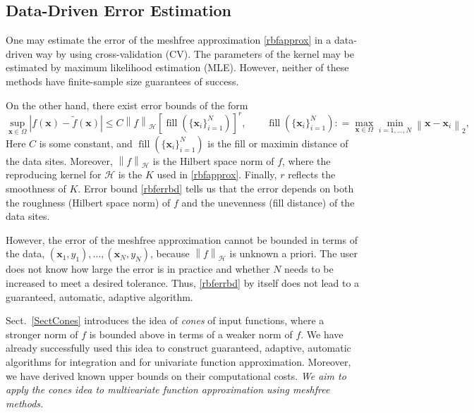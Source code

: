 \documentclass[11pt]{NSFamsart}
\newcommand{\tf}{\tilde{f}}
\newcommand{\bx}{{\boldsymbol{x}}}
\newcommand{\cx}{{\Omega}}
\def\abs#1{\ensuremath{\left \lvert #1 \right \rvert}}
\newcommand{\norm}[2][{}]{\ensuremath{\left \lVert #2 \right \rVert}_{#1}}
\DeclareMathOperator{\filldis}{fill}
\newcommand{\desn}{\{\bx_i\}_{i=1}^N}
\newcommand{\ch}{\mathcal{H}}
\begin{document}
\subsection*{Data-Driven Error Estimation} One may estimate the error of the meshfree approximation \eqref{rbfapprox} in a data-driven way by using cross-validation (CV).  The parameters of the kernel may be estimated by maximum likelihood estimation (MLE).  However, neither of these methods have finite-sample size guarantees of success.

On the other hand, there exist error bounds of the form \citep{Wen05a}
\begin{equation} \label{rbferrbd}
\sup_{\bx \in \cx} \abs{f(\bx) - \tf(\bx)} \le C \norm[\ch]{f} [\filldis(\desn)]^r, \qquad \filldis(\desn): = \max_{\bx \in \cx} \min_{i=1,  \ldots, N} \norm[2]{\bx - \bx_i},
\end{equation}
Here $C$ is some constant, and $\filldis(\{\bx_i\}_{i=1}^N)$ is the fill or maximin distance of the data sites.  Moreover, $\norm[\ch]{f}$ is the Hilbert space norm of $f$, where the reproducing kernel for $\ch$ is the $K$ used in \eqref{rbfapprox}. Finally, $r$ reflects the smoothness of $K$.  Error bound \eqref{rbferrbd} tells us that the error depends on both the roughness (Hilbert space norm) of $f$ and the unevenness (fill distance) of the data sites.

However, the error of the meshfree approximation cannot be bounded in terms of the data, $(\bx_1, y_1), \ldots, (\bx_N,y_N)$, because $\norm[\ch]{f}$ is unknown a priori.  The user does not know how large the error is in practice and whether $N$ needs to be increased to meet a desired tolerance. Thus, \eqref{rbferrbd} by itself does not lead to a guaranteed, automatic, adaptive algorithm.

Sect.\ \ref{SectCones} introduces the idea of \emph{cones} of input functions, where a stronger norm of $f$ is bounded above in terms of a weaker norm of $f$.  We have already successfully used this idea to construct guaranteed, adaptive, automatic algorithms for integration and for univariate function approximation.  Moreover, we have derived known upper bounds on their computational costs. \emph{We aim to apply the cones idea to multivariate function approximation using meshfree methods.}
\end{document}
